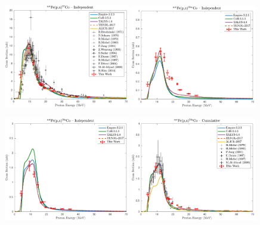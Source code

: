 \begin{figure}
 \centering
 \includegraphics[width=0.49\textwidth]{./figures/57Co.pdf}
 \includegraphics[width=0.49\textwidth]{./figures/58mCo.pdf}
 
 
 \includegraphics[width=0.49\textwidth]{./figures/58gCo.pdf}
 \includegraphics[width=0.49\textwidth]{./figures/58Co.pdf}
 

\end{figure}
